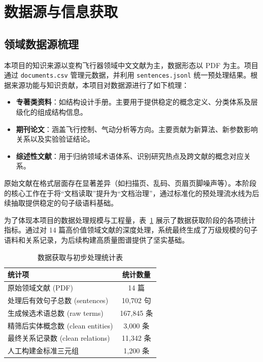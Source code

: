 \section{数据源与信息获取}
\subsection{领域数据源梳理}
本项目的知识来源以变构飞行器领域中文文献为主，数据形态以 PDF 为主。项目通过 \texttt{documents.csv} 管理元数据，并利用 \texttt{sentences.jsonl} 统一预处理结果。根据来源功能与知识贡献，本项目对数据源进行了如下梳理：

\begin{itemize}[leftmargin=2em]
    \item \textbf{专著类资料}：如结构设计手册。主要用于提供稳定的概念定义、分类体系及层级化的组成结构信息。
    \item \textbf{期刊论文}：涵盖飞行控制、气动分析等方向。主要贡献为新算法、新参数影响关系以及实验验证结论。
    \item \textbf{综述性文献}：用于归纳领域术语体系、识别研究热点及跨文献的概念对应关系。
\end{itemize}

原始文献在格式层面存在显著差异（如扫描页、乱码、页眉页脚噪声等）。本阶段的核心工作在于将“文档读取”提升为“文档治理”，通过标准化的预处理流水线为后续抽取提供稳定的句子级语料基础。

为了体现本项目的数据处理规模与工程量，表~\ref{tab:data-stats} 展示了数据获取阶段的各项统计指标。通过对 14 篇高价值领域文献的深度处理，系统最终生成了万级规模的句子语料和关系记录，为后续构建高质量图谱提供了坚实基础。

\begin{table}[H]
\centering
\caption{数据获取与初步处理统计表}
\label{tab:data-stats}
\renewcommand{\arraystretch}{1.2}
\begin{tabular}{lc}
\toprule
\textbf{统计项} & \textbf{统计数量} \\
\midrule
原始领域文献 (PDF) & 14 篇 \\
处理后有效句子总数 (sentences) & 10,702 句 \\
生成候选术语总数 (raw terms) & 167,845 条 \\
精筛后实体概念数 (clean entities) & 3,000 条 \\
最终关系记录数 (clean relations) & 11,342 条 \\
人工构建金标准三元组 & 1,200 条 \\
\bottomrule
\end{tabular}
\end{table}

